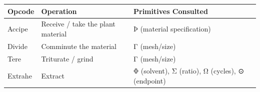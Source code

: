 \begin{longtable}[]{@{}lll@{}}
\toprule
\begin{minipage}[b]{0.30\columnwidth}\raggedright
Opcode\strut
\end{minipage} & \begin{minipage}[b]{0.30\columnwidth}\raggedright
Operation\strut
\end{minipage} & \begin{minipage}[b]{0.30\columnwidth}\raggedright
Primitives Consulted\strut
\end{minipage}\tabularnewline
\midrule
\endhead
\begin{minipage}[t]{0.30\columnwidth}\raggedright
Accipe\strut
\end{minipage} & \begin{minipage}[t]{0.30\columnwidth}\raggedright
Receive / take the plant material\strut
\end{minipage} & \begin{minipage}[t]{0.30\columnwidth}\raggedright
Þ (material specification)\strut
\end{minipage}\tabularnewline
\begin{minipage}[t]{0.30\columnwidth}\raggedright
Divide\strut
\end{minipage} & \begin{minipage}[t]{0.30\columnwidth}\raggedright
Comminute the material\strut
\end{minipage} & \begin{minipage}[t]{0.30\columnwidth}\raggedright
Γ (mesh/size)\strut
\end{minipage}\tabularnewline
\begin{minipage}[t]{0.30\columnwidth}\raggedright
Tere\strut
\end{minipage} & \begin{minipage}[t]{0.30\columnwidth}\raggedright
Triturate / grind\strut
\end{minipage} & \begin{minipage}[t]{0.30\columnwidth}\raggedright
Γ (mesh/size)\strut
\end{minipage}\tabularnewline
\begin{minipage}[t]{0.30\columnwidth}\raggedright
Extrahe\strut
\end{minipage} & \begin{minipage}[t]{0.30\columnwidth}\raggedright
Extract\strut
\end{minipage} & \begin{minipage}[t]{0.30\columnwidth}\raggedright
Φ (solvent), Σ (ratio), Ω (cycles), ⊙ (endpoint)\strut

\end{minipage}
\end{longtable}

